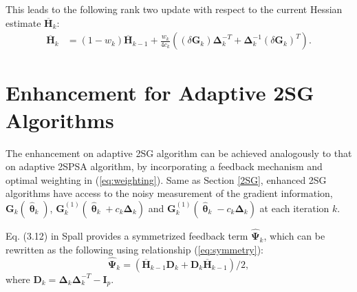 \documentclass[conference,10.3cpt]{IEEEtran}
\newcommand{\bD}{\bm{D}}
\newcommand{\bG}{\bm{G}}
\newcommand{\bI}{\bm{I}}
\newcommand{\bDelta}{\bm{\Delta}}
\newcommand{\oH}{\bm{\overline{H}}}
\newcommand{\hPsi}{\bm{\hat{\Psi}}}
\newcommand{\htheta}{\bm{\hat{\uptheta}}}
\newcommand{\remove}[1]{}
\begin{document}
This leads to the following rank two update with respect to
the current Hessian estimate $\oH_k$:
\begin{align*}
\oH_k &= (1 - w_k) \oH_{k-1} + \frac{w_k}{4c_k} ((\delta\bG_k)\bDelta_k^{-T}+\bDelta_k^{-1}(\delta\bG_k)^{T}).
\end{align*} \remove{ Above gives a rank-two update from $
  \oH_{k-1}^{-1} $ to $ \oH_{k}^{-1} $. Write the sequential recursions
  for the $ \oH_k^{-1} $ as following:
  \begin{equation} \label{eq:2SGSequentialUpdate}
    \begin{dcases} \bm{B}_k^{-1}
      &=\frac{k+1}{k}\oH_{k-1}^{-1}-(\frac{k+1}{k})^2\oH_{k-1}^{-1}(\delta\bG_k)\\
      &~~~\cdot(b_k^{-1}+\frac{k+1}{k}\bDelta_k^{-T}\oH_{k-1}^{-1}(\delta\bG_k)\bDelta_k^{-T}\oH_{k-1}^{-1}\\
      \oH_k^{-1} &=\bm{B}_k^{-1}-\bm{B}_k^{-1}\bDelta_k^{-1}\\
      &~~~\cdot(b_k^{-1}+(\delta\bG_k)^{T}\bm{B}_k^{-1}\bDelta_k^{-1})^{-1}(\delta\bG_k)^{T}\bm{B}_k^{-1}
    \end{dcases}
  \end{equation} where
  \begin{equation}\label{eq:2SGB}
    \bm{B}_k=\frac{k}{k+1}\oH_{k-1}+b_k(\delta\bG_k)\bDelta_k^{-T}
  \end{equation}}

\section{Enhancement for Adaptive 2SG Algorithms}  \label{Enhanced 2SG}
 The enhancement on adaptive 2SG algorithm can be achieved analogously to that on adaptive 2SPSA algorithm, by incorporating a feedback
 mechanism and optimal weighting in (\ref{eq:weighting}). Same as Section \ref{2SG}, enhanced 2SG algorithms have access
 to the noisy measurement of the gradient information,
 $\bG_k(\htheta_k)$, $\bG_k^{(1)}(\htheta_k+ c_k\bDelta_k)$ and
 $\bG_k^{(1)}(\htheta_k- c_k\bDelta_k)$ at each iteration $k$.

	Eq. (3.12) in Spall \cite{Spall2009} provides a symmetrized feedback term $ \hPsi_k $, which can be rewritten as the following using relationship (\ref{eq:symmetry}):
	\begin{equation}
	\hPsi_k =(\oH_{k-1}\bD_k+\bD_k\oH_{k-1})/2,
	\end{equation}
	where $ \bD_k=\bDelta_k\bDelta_k^{-T}-\bI_p$.
\end{document}
